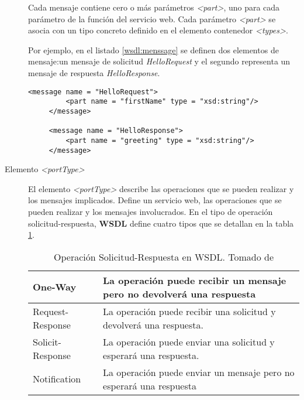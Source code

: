 \begin{description}
 	Cada mensaje contiene cero o más parámetros \textit{<part>}, uno para cada parámetro de la función del servicio web. 	
 	Cada parámetro \textit{<part>} se asocia con un tipo concreto definido en el elemento contenedor \textit{<types>}.
 	
    Por ejemplo, en el listado \ref{wsdl:menssage}  se definen dos elementos de mensaje:un mensaje de solicitud \textit{HelloRequest} y el segundo representa un mensaje de respuesta  \textit{HelloResponse}.	
 	
 	\begin{lstlisting}[label=wsdl:menssage, caption=Descripci\'on del elemento <message>. Tomado de \cite{W3C2022}]
 	 <message name = "HelloRequest">
 		 <part name = "firstName" type = "xsd:string"/>
 	 </message>
 	 
 	 <message name = "HelloResponse">
 		 <part name = "greeting" type = "xsd:string"/>
 	 </message>
 	\end{lstlisting}
 	
 	
 	\item [Elemento \textit{<portType>}] El elemento  \textit{<portType>} describe las operaciones que se pueden realizar y los mensajes implicados.  Define un servicio web, las operaciones que se pueden realizar y los mensajes involucrados.  	
 	En el  tipo de operación solicitud-respuesta, \textbf{WSDL} define cuatro tipos que se  detallan en la tabla \ref{tab:wsdl-oper-sol-resp}.
 	
 	\begin{table}[h]
 		\footnotesize%
 		\begin{center}
 			\footnotesize
 			\begin{tabular}{p{}p{}}
 				\hline
 				\quad  One-Way  & La operación puede recibir un mensaje pero no devolverá una respuesta \\ 	
 				\hline
 				\quad Request-Response & La operación puede recibir una solicitud y devolverá una respuesta. \\
 				\hline
 				\quad Solicit-Response & La operación puede enviar una solicitud y esperará una respuesta.  \\
 				\hline
 				\quad Notification & La operación puede enviar un mensaje pero no esperará una respuesta  \\
 				\hline
 				
 			\end{tabular}
 		\end{center}
 		\caption{Operaci\'on Solicitud-Respuesta en WSDL. Tomado de \cite{W3C2022} }
 		\label{tab:wsdl-oper-sol-resp}
 	\end{table}
 	

\end{description}
